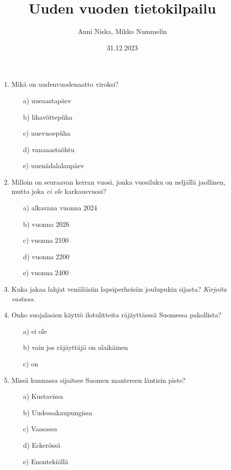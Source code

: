 \documentclass[a4paper,12pt,twoside]{article}
\begin{document}
\title{Uuden vuoden tietokilpailu}
\author{Anni Niska, Mikko Nummelin}
\date{31.12.2023}
\maketitle
\begin{enumerate}
\item{Mikä on uudenvuodenaatto viroksi?}
  \begin{itemize}
  \item[a)]{uueaastapäev}
  \item[b)]{lihavõttepüha}
  \item[c)]{uuevuoepüha}
  \item[d)]{vanaaastaõhtu}
  \item[e)]{uuenädalalaupäev}
  \end{itemize}
\item{Milloin on seuraavan kerran vuosi, jonka vuosiluku on neljällä jaollinen, mutta joka \emph{ei ole} karkausvuosi?}
  \begin{itemize}
  \item[a)]{alkavana vuonna 2024}
  \item[b)]{vuonna 2026}
  \item[c)]{vuonna 2100}
  \item[d)]{vuonna 2200}
  \item[e)]{vuonna 2400}
  \end{itemize}
\item{Kuka jakaa lahjat venäläisiin lapsiperheisiin joulupukin sijasta?}
  \newline\emph{Kirjoita vastaus.}
\item{Onko suojalasien käyttö ilotulitteita räjäyttäessä Suomessa pakollista?}
  \begin{itemize}
  \item[a)]{ei ole}
  \item[b)]{vain jos räjäyttäjä on alaikäinen}
  \item[c)]{on}
  \end{itemize}
  \newpage
\item{Missä kunnassa sijaitsee Suomen mantereen läntisin piste?}
  \begin{itemize}
  \item[a)]{Kustavissa}
  \item[b)]{Uudessakaupungissa}
  \item[c)]{Vaasassa}
  \item[d)]{Eckerössä}
  \item[e)]{Enontekiöllä}
  \end{itemize}

\end{enumerate}
\end{document}
